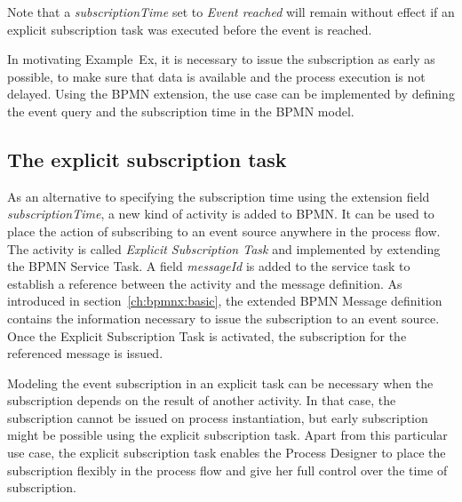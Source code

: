 Note that a \textit{subscriptionTime} set to \textit{Event reached} will remain without effect if an explicit subscription task was executed before the event is reached.


In motivating Example~Ex, it is necessary to issue the subscription as early as possible, to make sure that data is available and the process execution is not delayed. 
Using the BPMN extension, the use case can be implemented by defining the event query and the subscription time in the BPMN model. 

\subsection{The explicit subscription task}
As an alternative to specifying the subscription time using the extension field \textit{subscriptionTime}, a new kind of activity is added to BPMN. It can be used to place the action of subscribing to an event source anywhere in the process flow.
The activity is called \textit{Explicit Subscription Task} and implemented by extending the BPMN Service Task. A field \textit{messageId} is added to the service task to establish a reference between the activity and the message definition.
As introduced in section~\autoref{ch:bpmnx:basic}, the extended BPMN Message definition contains the information necessary to issue the subscription to an event source.
Once the Explicit Subscription Task is activated, the subscription for the referenced message is issued. 

Modeling the event subscription in an explicit task can be necessary when the subscription depends on the result of another activity. In that case, the subscription cannot be issued on process instantiation, but early subscription might be possible using the explicit subscription task.
Apart from this particular use case, the explicit subscription task enables the Process Designer to place the subscription flexibly in the process flow and give her full control over the time of subscription.



